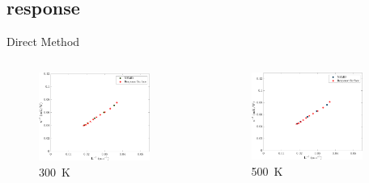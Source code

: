 \documentclass[xcolor={x11names,table},compress,svgnames,mathserif]{beamer}
\renewcommand{\(}{\begin{columns}}
\renewcommand{\)}{\end{columns}}
\newcommand{\<}[1]{\begin{column}{#1}}
\renewcommand{\>}{\end{column}}
\begin{document}
\subsection{response}
\begin{frame}{Direct Method}

\begin{columns}
\begin{column}{0.5\textwidth}
\begin{center}
\begin{figure}[htbp]
  \includegraphics[width=0.85\textwidth]{./Figures/kinv_300}
  \\ \vspace{1mm} \tiny{300~K}
  \end{figure}
\end{center}
\end{column}
\hspace{-6mm}
\begin{column}{0.5\textwidth}
\begin{center}
\begin{figure}[htbp]
  \includegraphics[width=0.85\textwidth]{./Figures/kinv_500}
   \\ \vspace{1mm}\tiny{500~K}
  \end{figure}
\end{center}
\end{column}


\end{columns}
\end{frame}
\end{document}
